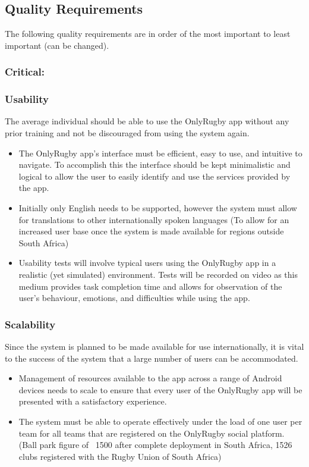 \subsection{Quality Requirements}
	The following quality requirements are in order of the most important to least important (can be changed).	
	\subsubsection{Critical:}
	\subsubsection*{Usability}
	The average individual should be able to use the OnlyRugby app without any prior training and not be discouraged from using the system again.
	\begin{itemize}
		\item The OnlyRugby app's interface must be efficient, easy to use, and intuitive to navigate. To accomplish this the interface should be kept minimalistic and logical to allow the user to easily identify and use the services provided by the app.
		\item Initially only English needs to be supported, however the system must allow for translations to other internationally spoken languages (To allow for an increased user base once the system is made available for regions outside South Africa)
		\item Usability tests will involve typical users using the OnlyRugby app in a realistic (yet simulated) environment. Tests will be recorded on video as this medium provides task completion time and allows for observation of the user's behaviour, emotions, and difficulties while using the app.
	\end{itemize}
	
	\subsubsection*{Scalability}
	Since the system is planned to be made available for use internationally, it is vital to the success of the system that a large number of users can be accommodated.
	\begin{itemize}
		\item Management of resources available to the app across a range of Android devices needs to scale to ensure that every user of the OnlyRugby app will be presented with a satisfactory experience.
		\item The system must be able to operate effectively under the load of one user per team for all teams that are registered on the OnlyRugby social platform. (Ball park figure of ~1500 after complete deployment in South Africa, 1526 clubs registered with the Rugby Union of South Africa)
	\end{itemize}

